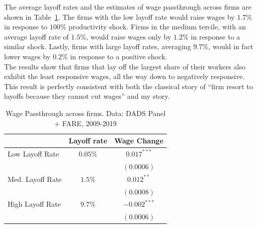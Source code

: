 The average layoff rates and the estimates of wage passthrough across firms are shown in Table~\ref{tab:acrossfirms}. The firms with the low layoff rate would raise wages by $1.7\%$ in response to $100\%$ productivity shock. Firms in the medium tercile, with an average layoff rate of $1.5\%$, would raise wages only by $1.2\%$ in response to a similar shock. Lastly, firms with large layoff rates, averaging $9.7\%$, would in fact lower wages by $0.2\%$ in response to a positive shock. \\
The results show that firms that lay off the largest share of their workers also exhibit the least responsive wages, all the way down to negatively responsive. This result is perfectly consistent with both the classical story of ``firm resort to layoffs because they cannot cut wages'' and my story.

\begin{table} 
  \centering
  \begin{tabular}{lcc}
    \hline
    & \multicolumn{1}{c}{Layoff rate} & \multicolumn{1}{c}{Wage Change} \\   
    \hline
     
    Low Layoff Rate    & $0.05\%$  &  $0.017^{***}$             \\     
                    &    &  $(0.0006)$              \\     
    Med. Layoff Rate    & $1.5\%$  &  $0.012^{**}$              \\     
                    &    &  $(0.0008)$              \\     
    High Layoff Rate    &  $9.7\%$  &  $-0.002^{***}$                 \\     
                    &    &  $(0.0006)$              \\  
    \hline
  \end{tabular}
  \caption{Wage Passthrough across firms. Data: DADS Panel + FARE, 2009-2019}
  \label{tab:acrossfirms}
\end{table}

